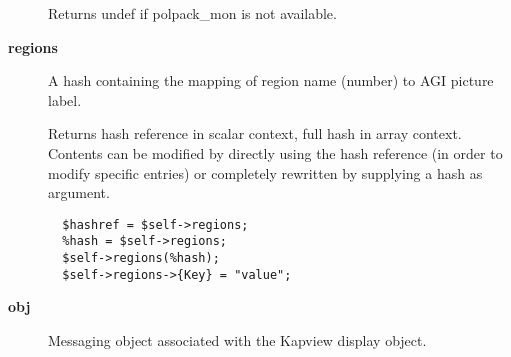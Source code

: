 \begin{description}
Returns undef if polpack\_mon is not available.

\item[\textbf{regions}] \mbox{}

A hash containing the mapping of region name (number) to
AGI picture label.



Returns hash reference in scalar context, full hash in array context.
Contents can be modified by directly using the hash reference
(in order to modify specific entries) or completely rewritten by
supplying a hash as argument.

\begin{verbatim}
  $hashref = $self->regions;
  %hash = $self->regions;
  $self->regions(%hash);
  $self->regions->{Key} = "value";
\end{verbatim}
\item[\textbf{obj}] \mbox{}

Messaging object associated with the Kapview display object.

\end{description}
